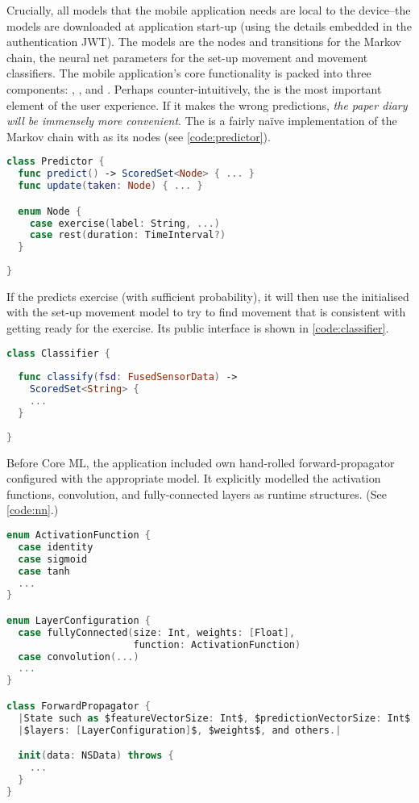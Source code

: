Crucially, all models that the mobile application needs are local to the device--the models are downloaded at application start-up (using the details embedded in the authentication JWT). The models are the nodes and transitions for the Markov chain, the neural net parameters for the set-up movement and movement classifiers. The mobile application's core functionality is packed into three components: , , and . Perhaps counter-intuitively, the  is the most important element of the user experience. If it makes the wrong predictions, \emph{the paper diary will be immensely more convenient}. The  is a fairly naïve implementation of the Markov chain with  as its nodes (see \autoref{code:predictor}).

\begin{lstlisting}[caption={Predictor}, label={code:predictor}, language=swift, escapechar=|]
class Predictor {
  func predict() -> ScoredSet<Node> { ... }
  func update(taken: Node) { ... }

  enum Node {
    case exercise(label: String, ...)
    case rest(duration: TimeInterval?)
  }
    
}
\end{lstlisting}

If the  predicts exercise (with sufficient probability), it will then use the  initialised with the set-up movement model to try to find movement that is consistent with getting ready for the exercise. Its public interface is shown in \autoref{code:classifier}.

\begin{lstlisting}[caption={Classifier}, label={code:classifier}, language=swift, escapechar=|]
class Classifier {
  
  func classify(fsd: FusedSensorData) -> 
    ScoredSet<String> {
    ...
  }
    
}
\end{lstlisting}

Before Core ML\cite{coreml}, the application included own hand-rolled forward-propagator configured with the appropriate model. It explicitly modelled the activation functions, convolution, and fully-connected layers as runtime structures. (See \autoref{code:nn}.)

\begin{lstlisting}[caption={Runtime structures for NN}, label={code:nn}, language=swift, escapechar=|]
enum ActivationFunction {
  case identity
  case sigmoid
  case tanh
  ...
}

enum LayerConfiguration {
  case fullyConnected(size: Int, weights: [Float], 
                      function: ActivationFunction)
  case convolution(...)
  ...
}

class ForwardPropagator {
  |State such as $featureVectorSize: Int$, $predictionVectorSize: Int$,|
  |$layers: [LayerConfiguration]$, $weights$, and others.|

  init(data: NSData) throws {
    ...
  }
}
\end{lstlisting}

